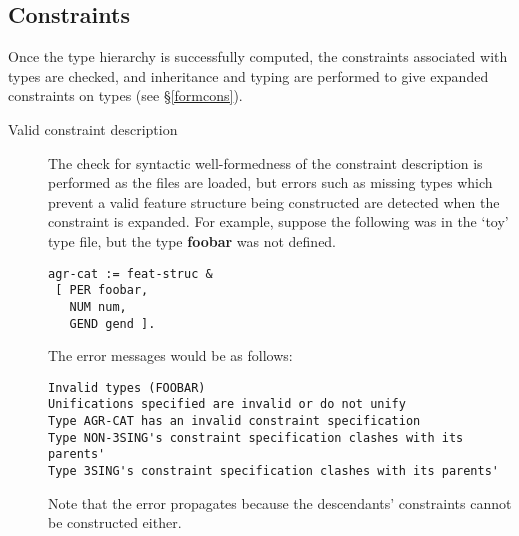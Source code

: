 \documentclass[12pt]{report}
\begin{document}
\subsection{Constraints}
Once the type hierarchy is successfully computed, the constraints
associated with types are checked, and inheritance
and typing are performed to give expanded constraints on types
(see \S\ref{formcons}).
\begin{description}
\item[Valid constraint description]
The check for syntactic well-formedness of the constraint description
is performed as the files are loaded, but errors such as 
missing types which prevent a valid feature structure being constructed
are detected when the constraint is expanded.
For example, suppose the following was in the 
`toy' type file, but the type 
{\bf foobar} was not defined.
\begin{verbatim}
agr-cat := feat-struc &
 [ PER foobar,
   NUM num,
   GEND gend ].
\end{verbatim}
The error messages would be as follows:
\begin{verbatim}
Invalid types (FOOBAR)
Unifications specified are invalid or do not unify
Type AGR-CAT has an invalid constraint specification
Type NON-3SING's constraint specification clashes with its parents'
Type 3SING's constraint specification clashes with its parents'
\end{verbatim}
Note that the error propagates because the descendants'
constraints cannot
be constructed either.


\end{description}
\end{document}
